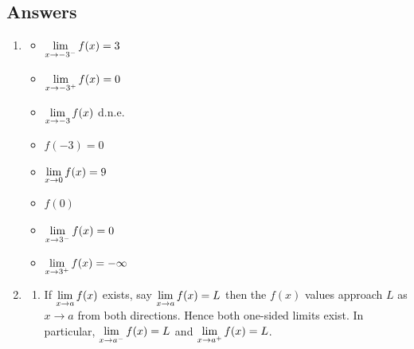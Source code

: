 \documentclass{ximera}
\begin{document}
\newpage

\subsection{Answers}

\begin{enumerate}

\item  \begin{multicols}{4} \begin{itemize} \item $\ds{\lim_{x \rightarrow -3^{-}} f(x) = 3}$

\item $\ds{\lim_{x \rightarrow -3^{+}} f(x) = 0}$

\item $\ds{\lim_{x \rightarrow -3} f(x)}$ d.n.e.

\item $f(-3) = 0$

\end{itemize}

\end{multicols}

\bigskip

\begin{multicols}{4}

\begin{itemize}

\item $\ds{\lim_{x \rightarrow 0} f(x) = 9}$

\item  $f(0)$

\item $\ds{\lim_{x \rightarrow 3^{-}} f(x) = 0}$

\item $\ds{\lim_{x \rightarrow 3^{+}} f(x) = -\infty}$
\end{itemize}

\end{multicols}

\bigskip


\item  \begin{enumerate}  \item  If $\ds{\lim_{x \rightarrow a} f(x)}$ exists, say $\ds{\lim_{x \rightarrow a} f(x) = L}$ then the $f(x)$ values approach  $L$  as $x \rightarrow a$ from both directions.  Hence both one-sided limits exist.  In particular,  $\ds{\lim_{x \rightarrow a^{-}} f(x) = L}$ and $\ds{\lim_{x \rightarrow a^{+}} f(x) = L}$.


\end{enumerate}
\end{enumerate}
\end{document}
